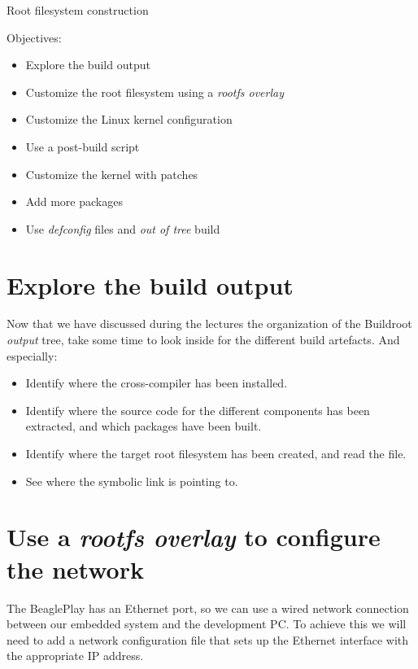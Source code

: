 \subchapter
{Root filesystem construction}
{Objectives:
  \begin{itemize}
  \item Explore the build output
  \item Customize the root filesystem using a {\em rootfs overlay}
  \item Customize the Linux kernel configuration
  \item Use a post-build script
  \item Customize the kernel with patches
  \item Add more packages
  \item Use {\em defconfig} files and {\em out of tree} build
  \end{itemize}
}

\section{Explore the build output}

Now that we have discussed during the lectures the organization of the
Buildroot {\em output} tree, take some time to look inside
 for the different build artefacts. And especially:

\begin{itemize}

\item Identify where the cross-compiler has been installed.

\item Identify where the source code for the different components has
  been extracted, and which packages have been built.

\item Identify where the target root filesystem has been created, and
  read the  file.

\item See where the  symbolic link is pointing to.

\end{itemize}

\section{Use a {\em rootfs overlay} to configure the network}

The BeaglePlay has an Ethernet port, so we can use a wired network
connection between our embedded system and the development PC. To
achieve this we will need to add a network configuration file that
sets up the Ethernet interface with the appropriate IP address.

